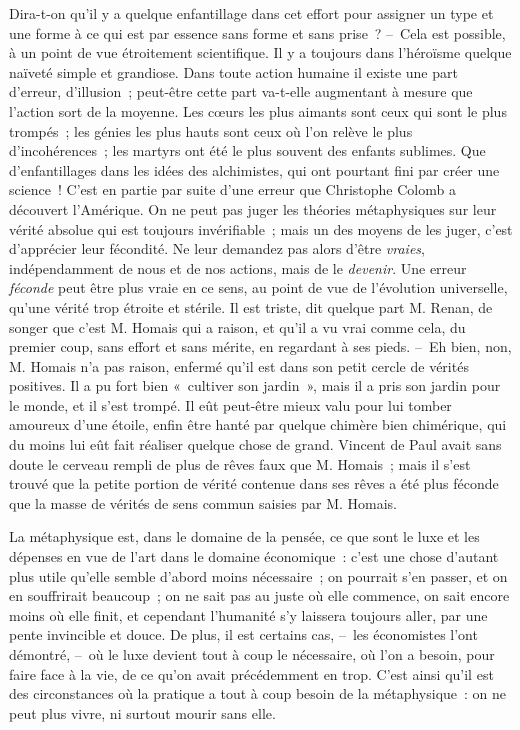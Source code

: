 \documentclass[french,twoside]{book} %
\begin{document}
Dira-t-on qu’il y a quelque enfantillage dans cet effort pour assigner un type et une forme à ce qui est par essence sans forme et sans prise ? – Cela est possible, à un point de vue étroitement scientifique. Il y a toujours dans l’héroïsme quelque naïveté simple et grandiose. Dans toute action humaine il existe une part d’erreur, d’illusion ; peut-être cette part va-t-elle augmentant à mesure que l’action sort de la moyenne. Les cœurs les plus aimants sont ceux qui sont le plus trompés ; les génies les plus hauts sont ceux où l’on relève le plus d’incohérences ; les martyrs ont été le plus souvent des enfants sublimes. Que d’enfantillages dans les idées des alchimistes, qui ont pourtant fini par créer une science ! C’est en partie par suite d’une erreur que Christophe Colomb a découvert l’Amérique. On ne peut pas juger les théories métaphysiques sur leur vérité absolue qui est toujours invérifiable ; mais un des moyens de les juger, c’est d’apprécier leur fécondité. Ne leur demandez pas alors d’être \emph{vraies}, indépendamment de nous et de nos actions, mais de le \emph{devenir}. Une erreur \emph{féconde} peut être plus vraie en ce sens, au point de vue de l’évolution universelle, qu’une vérité trop étroite et stérile. Il est triste, dit quelque part M. Renan, de songer que c’est M. Homais qui a raison, et qu’il a vu vrai comme cela, du premier coup, sans effort et sans mérite, en regardant à ses pieds. – Eh bien, non, M. Homais n’a pas raison, enfermé qu’il est dans son petit cercle de vérités positives. Il a pu fort bien « cultiver son jardin », mais il a pris son jardin pour le monde, et il s’est trompé. Il eût peut-être mieux valu pour lui tomber amoureux d’une étoile, enfin être hanté par quelque chimère bien chimérique, qui du moins lui eût fait réaliser quelque chose de grand. Vincent de Paul avait sans doute le cerveau rempli de plus de rêves faux que M. Homais ; mais il s’est trouvé que la petite portion de vérité contenue dans ses rêves a été plus féconde que la masse de vérités de sens commun saisies par M. Homais.\par
La métaphysique est, dans le domaine de la pensée, ce que sont le luxe et les dépenses en vue de l’art dans le domaine économique : c’est une chose d’autant plus utile qu’elle semble d’abord moins nécessaire ; on pourrait s’en passer, et on en souffrirait beaucoup ; on ne sait pas au juste où elle commence, on sait encore moins où elle finit, et cependant l’humanité s’y laissera toujours aller, par une pente invincible et douce. De plus, il est certains cas, – les économistes l’ont démontré, – où le luxe devient tout à coup le nécessaire, où l’on a besoin, pour faire face à la vie, de ce qu’on avait précédemment en trop. C’est ainsi qu’il est des circonstances où la pratique a tout à coup besoin de la métaphysique : on ne peut plus vivre, ni surtout mourir sans elle.\par
\end{document}
